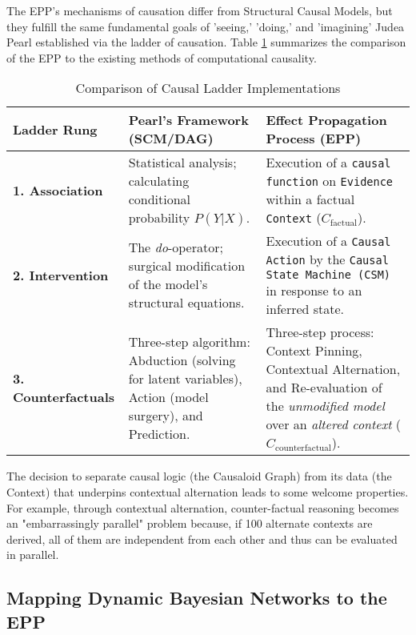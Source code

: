 The EPP's mechanisms of causation differ from Structural Causal Models, 
but they fulfill the same fundamental goals of 'seeing,' 'doing,' and 'imagining' Judea Pearl established
via the ladder of causation. Table \ref{tab:ladder_comparison} summarizes the comparison of the EPP to the existing methods of computational causality.
 

\begin{table}[h!]
\centering
\caption{Comparison of Causal Ladder Implementations}
\label{tab:ladder_comparison}
\begin{tabular}{|l|p{5.5cm}|p{5.5cm}|}
\hline
\textbf{Ladder Rung} & \textbf{Pearl's Framework (SCM/DAG)} & \textbf{Effect Propagation Process (EPP)} \\
\hline
\textbf{1. Association} &
Statistical analysis; calculating conditional probability $P(Y|X)$. &
Execution of a \texttt{causal function} on \texttt{Evidence} within a factual \texttt{Context} ($C_{\text{factual}}$). \\
\hline
\textbf{2. Intervention} &
The \textit{do}-operator; surgical modification of the model's structural equations. &
Execution of a \texttt{Causal Action} by the \texttt{Causal State Machine (CSM)} in response to an inferred state. \\
\hline
\textbf{3. Counterfactuals} &
Three-step algorithm: Abduction (solving for latent variables), Action (model surgery), and Prediction. &
Three-step process: Context Pinning, Contextual Alternation, and Re-evaluation of the \textit{unmodified model} over an \textit{altered context} ($C_{\text{counterfactual}}$). \\
\hline
\end{tabular}
\end{table}

The decision to separate causal logic (the Causaloid Graph) from its data (the Context) that underpins
contextual alternation leads to some welcome properties. For example, through contextual alternation,  counter-factual reasoning becomes an "embarrassingly parallel" problem because, if 100 alternate contexts are derived, all of them are independent from each other and thus can be evaluated in parallel. 


%
%
\subsection{Mapping Dynamic Bayesian Networks to the EPP}
\label{sec:epp_Dynamic_Bayesian_Networks}

